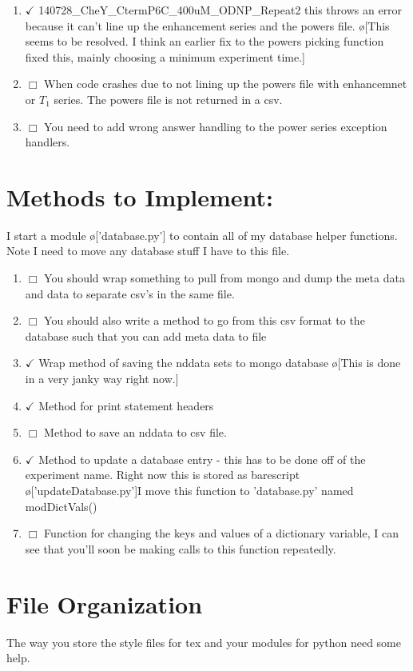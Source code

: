 \documentclass[10pt]{book}
\begin{document}
\begin{enumerate}
    \item $\checkmark$ 140728_CheY_CtermP6C_400uM_ODNP_Repeat2 this throws an error because it can't line up the enhancement series and the powers file. \o[This seems to be resolved. I think an earlier fix to the powers picking function fixed this, mainly choosing a minimum experiment time.]{}
    \item $\Box$ When code crashes due to not lining up the powers file with enhancemnet or $T_1$ series. The powers file is not returned in a csv.
    \item $\Box$ You need to add wrong answer handling to the power series exception handlers.
\end{enumerate}
\section{Methods to Implement:}
I start a module \o['database.py']{} to contain all of my database helper functions. Note I need to move any database stuff I have to this file.

\begin{enumerate}
    \item $\Box$ You should wrap something to pull from mongo and dump the meta data and data to separate csv's in the same file.
    \item $\Box$ You should also write a method to go from this csv format to the database such that you can add meta data to file
    \item $\checkmark$ Wrap method of saving the nddata sets to mongo database \o[This is done in a very janky way right now.]{}
    \item $\checkmark$ Method for print statement headers
    \item $\Box$ Method to save an nddata to csv file.
    \item $\checkmark$ Method to update a database entry - this has to be done off of the experiment name. Right now this is stored as barescript \o['updateDatabase.py']{I move this function to 'database.py' named modDictVals()}
    \item $\Box$ Function for changing the keys and values of a dictionary variable, I can see that you'll soon be making calls to this function repeatedly.
\end{enumerate}
\section{File Organization}
The way you store the style files for tex and your modules for python need some help.
\end{document}
